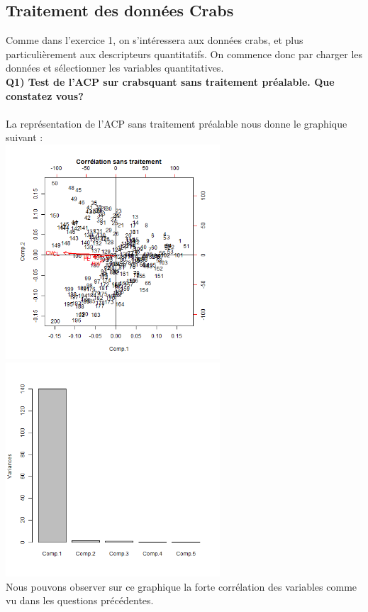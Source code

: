 \documentclass[a4paper, 9pt]{article}
\begin{document}
\subsection{Traitement des donn\'ees Crabs}
Comme dans l’exercice 1, on s’intéressera aux données crabs, et plus particulièrement aux descripteurs quantitatifs. On commence donc par charger les données et sélectionner les variables
quantitatives.\\

\textbf{Q1) Test de l’ACP sur crabsquant sans traitement préalable. Que constatez vous?}\\ \\
La repr\'esentation de l'ACP sans traitement pr\'ealable nous donne le graphique suivant :\\

\includegraphics[height = 8cm, width = 8cm]{plots/biplot_acp2_crabs.png}
\includegraphics[height = 8cm, width = 8cm]{plots/plot_acp2_crabs.png}\\
Nous pouvons observer sur ce graphique la forte corr\'elation des variables comme vu dans les questions pr\'ec\'edentes.\\ \\
\end{document}
